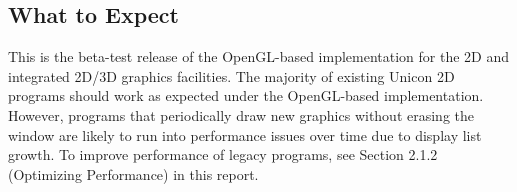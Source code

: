 \documentclass[letterpaper,12pt]{article}
\begin{document}
\subsection{What to Expect}

This is the beta-test release of the OpenGL-based implementation for the
2D and integrated 2D/3D graphics facilities. The majority of existing Unicon
2D programs should work as expected under the OpenGL-based implementation.
However, programs that periodically draw new graphics without erasing the
window are likely to run into performance issues over time
due to display list growth. To improve performance
of legacy programs, see Section 2.1.2 (Optimizing Performance) in this
report. 
\end{document}
